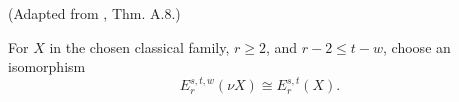 \begin{definition}
\label{frontier:Literature:c8c44dc9bb6c}
(Adapted from \cite{BHS}, Thm. A.8.)\par{}

For $X$ in the chosen classical family, $r\ge2$, and $r-2\le t-w$, choose an isomorphism\[E_r^{s,t,w}(\nu X)\cong E_r^{s,t}(X).\]
\end{definition}



